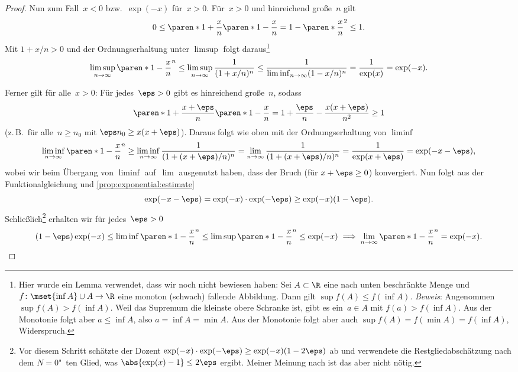 \documentclass[a4paper]{article}
\begin{document}
\begin{proof}
    Nun zum Fall~$x < 0$ bzw.\ $\exp(-x)$ für~$x > 0$. Für~$x > 0$ und hinreichend große~$n$ gilt
    \begin{equation*}
        0 \leq \paren*{1+\frac{x}{n}} \paren*{1-\frac{x}{n}} = 1 - \paren*{\frac{x}{n}}^2 \leq 1.
    \end{equation*}
    Mit $1+x/n > 0$ und der Ordnungserhaltung unter $\limsup$ folgt daraus\footnote{Hier wurde ein Lemma verwendet, dass wir noch nicht bewiesen haben: Sei $A \subset \R$ eine nach unten beschränkte Menge und $f\colon \mset{\inf A} \cup A \to \R$ eine monoton (schwach) fallende Abbildung. Dann gilt $\sup f(A) \leq f(\inf A)$. \emph{Beweis}: Angenommen $\sup f(A) > f(\inf A)$. Weil das Supremum die kleinste obere Schranke ist, gibt es ein~$a \in A$ mit $f(a) > f(\inf A)$. Aus der Monotonie folgt aber $a \leq \inf A$, also $a = \inf A = \min A$. Aus der Monotonie folgt aber auch $\sup f(A) = f(\min A) = f(\inf A)$, Widerspruch.}
    \begin{equation*}
        \limsup_{n\to\infty} \paren*{1-\frac{x}{n}}^n \leq \limsup_{n\to\infty} \frac{1}{(1+x/n)^n} \leq \frac{1}{\liminf_{n\to\infty} (1-x/n)^n} = \frac{1}{\exp(x)} = \exp(-x).
    \end{equation*}

    Ferner gilt für alle~$x > 0$: Für jedes~$\eps > 0$ gibt es hinreichend große~$n$, sodass
    \begin{equation*}
        \paren*{1+\frac{x+\eps}{n}} \paren*{1-\frac{x}{n}} = 1 + \frac{\eps}{n} - \frac{x(x+\eps)}{n^2} \geq 1
    \end{equation*}
    (z.\,B.\ für alle~$n \geq n_0$ mit $\eps n_0 \geq x(x+\eps)$). Daraus folgt wie oben mit der Ordnungserhaltung von $\liminf$
    \begin{equation*}
        \liminf_{n\to\infty} \paren*{1-\frac{x}{n}}^n \geq \liminf_{n\to\infty} \frac{1}{(1 + (x+\eps)/n)^n} = \lim_{n\to\infty} \frac{1}{(1 + (x+\eps)/n)^n} = \frac{1}{\exp(x+\eps)} = \exp(-x-\eps),
    \end{equation*}
    wobei wir beim Übergang von $\liminf$ auf~$\lim$ ausgenutzt haben, dass der Bruch (für $x+\eps \geq 0$) konvergiert. Nun folgt aus der Funktionalgleichung und \cref{prop:exponential:estimate}
    \begin{equation*}
        \exp(-x-\eps) = \exp(-x) \cdot \exp(-\eps) \geq \exp(-x) (1-\eps).
    \end{equation*}
    Schließlich\footnote{Vor diesem Schritt schätzte der Dozent $\exp(-x) \cdot \exp(-\eps) \geq \exp(-x) (1-2\eps)$ ab und verwendete die Restgliedabschätzung nach dem $N = 0$"~ten Glied, was $\abs{\exp(x) - 1} \leq 2\eps$ ergibt. Meiner Meinung nach ist das aber nicht nötig.} erhalten wir für jedes~$\eps > 0$
    \begin{equation*}
        (1-\eps) \exp(-x) \leq \liminf \paren*{1-\frac{x}{n}}^n \leq \limsup \paren*{1-\frac{x}{n}}^n \leq \exp(-x) \implies \lim_{n\to\infty} \paren*{1-\frac{x}{n}}^n = \exp(-x). \qedhere
    \end{equation*}
\end{proof}
\end{document}

